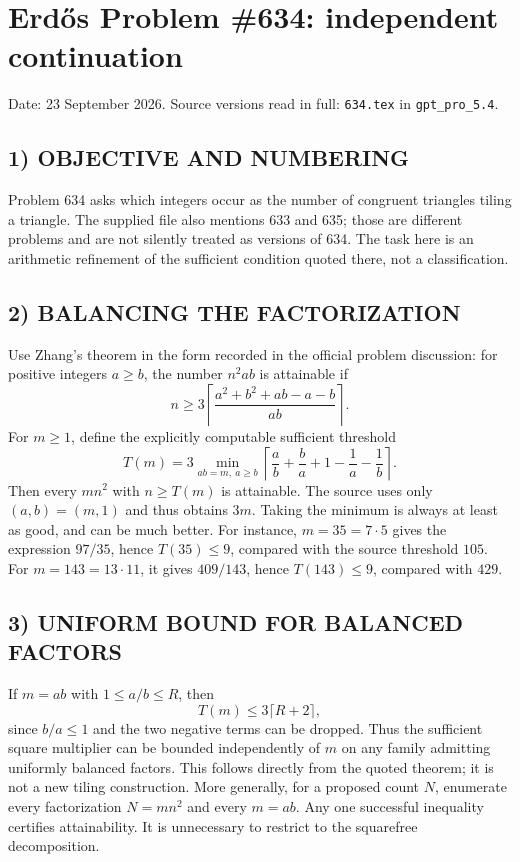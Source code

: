 \section{Erd\H{o}s Problem \#634: independent continuation}
\noindent Date: 23 September 2026. Source versions read in full: \texttt{634.tex} in \texttt{gpt\_pro\_5.4}.

\subsection*{1) OBJECTIVE AND NUMBERING}
Problem 634 asks which integers occur as the number of congruent triangles tiling a triangle. The supplied file also mentions 633 and 635; those are different problems and are not silently treated as versions of 634. The task here is an arithmetic refinement of the sufficient condition quoted there, not a classification.
\subsection*{2) BALANCING THE FACTORIZATION}
Use Zhang's theorem in the form recorded in the official problem discussion: for positive integers $a\ge b$, the number $n^2ab$ is attainable if
\[
n\ge3\left\lceil\frac{a^2+b^2+ab-a-b}{ab}\right\rceil.
\]
For $m\ge1$, define the explicitly computable sufficient threshold
\[
T(m)=3\min_{ab=m,\ a\ge b}\left\lceil\frac ab+\frac ba+1-\frac1a-\frac1b\right\rceil.
\]
Then every $mn^2$ with $n\ge T(m)$ is attainable. The source uses only $(a,b)=(m,1)$ and thus obtains $3m$. Taking the minimum is always at least as good, and can be much better.
For instance, $m=35=7\cdot5$ gives the expression $97/35$, hence $T(35)\le9$, compared with the source threshold $105$. For $m=143=13\cdot11$, it gives $409/143$, hence $T(143)\le9$, compared with $429$.
\subsection*{3) UNIFORM BOUND FOR BALANCED FACTORS}
If $m=ab$ with $1\le a/b\le R$, then
\[
T(m)\le3\lceil R+2\rceil,
\]
since $b/a\le1$ and the two negative terms can be dropped. Thus the sufficient square multiplier can be bounded independently of $m$ on any family admitting uniformly balanced factors. This follows directly from the quoted theorem; it is not a new tiling construction.
More generally, for a proposed count $N$, enumerate every factorization $N=mn^2$ and every $m=ab$. Any one successful inequality certifies attainability. It is unnecessary to restrict to the squarefree decomposition.
